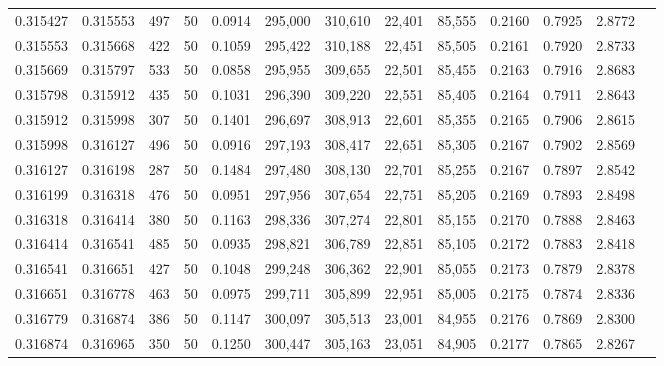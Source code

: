 \begin{tabular}{rrrrrrrrrrrrr}
0.315427 & 0.315553 &   497 &  50 &                                     0.0914 & 295,000 & 310,610 &  22,401 &  85,555 & 0.2160 & 0.7925 & 2.8772 \\
0.315553 & 0.315668 &   422 &  50 &                                     0.1059 & 295,422 & 310,188 &  22,451 &  85,505 & 0.2161 & 0.7920 & 2.8733 \\
0.315669 & 0.315797 &   533 &  50 &                                     0.0858 & 295,955 & 309,655 &  22,501 &  85,455 & 0.2163 & 0.7916 & 2.8683 \\
0.315798 & 0.315912 &   435 &  50 &                                     0.1031 & 296,390 & 309,220 &  22,551 &  85,405 & 0.2164 & 0.7911 & 2.8643 \\
0.315912 & 0.315998 &   307 &  50 &                                     0.1401 & 296,697 & 308,913 &  22,601 &  85,355 & 0.2165 & 0.7906 & 2.8615 \\
0.315998 & 0.316127 &   496 &  50 &                                     0.0916 & 297,193 & 308,417 &  22,651 &  85,305 & 0.2167 & 0.7902 & 2.8569 \\
0.316127 & 0.316198 &   287 &  50 &                                     0.1484 & 297,480 & 308,130 &  22,701 &  85,255 & 0.2167 & 0.7897 & 2.8542 \\
0.316199 & 0.316318 &   476 &  50 &                                     0.0951 & 297,956 & 307,654 &  22,751 &  85,205 & 0.2169 & 0.7893 & 2.8498 \\
0.316318 & 0.316414 &   380 &  50 &                                     0.1163 & 298,336 & 307,274 &  22,801 &  85,155 & 0.2170 & 0.7888 & 2.8463 \\
0.316414 & 0.316541 &   485 &  50 &                                     0.0935 & 298,821 & 306,789 &  22,851 &  85,105 & 0.2172 & 0.7883 & 2.8418 \\
0.316541 & 0.316651 &   427 &  50 &                                     0.1048 & 299,248 & 306,362 &  22,901 &  85,055 & 0.2173 & 0.7879 & 2.8378 \\
0.316651 & 0.316778 &   463 &  50 &                                     0.0975 & 299,711 & 305,899 &  22,951 &  85,005 & 0.2175 & 0.7874 & 2.8336 \\
0.316779 & 0.316874 &   386 &  50 &                                     0.1147 & 300,097 & 305,513 &  23,001 &  84,955 & 0.2176 & 0.7869 & 2.8300 \\
0.316874 & 0.316965 &   350 &  50 &                                     0.1250 & 300,447 & 305,163 &  23,051 &  84,905 & 0.2177 & 0.7865 & 2.8267 \\

\end{tabular}
